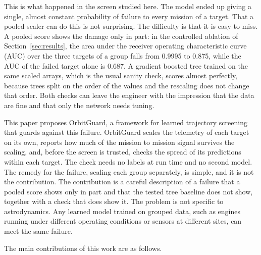This is what happened in the screen studied here. The model ended up giving a single, almost constant probability of failure to every mission of a target. That a pooled scaler can do this is not surprising. The difficulty is that it is easy to miss. A pooled score shows the damage only in part: in the controlled ablation of Section~\ref{sec:results}, the area under the receiver operating characteristic curve (AUC) over the three targets of a group falls from 0.9995 to 0.875, while the AUC of the failed target alone is 0.687. A gradient boosted tree trained on the same scaled arrays, which is the usual sanity check, scores almost perfectly, because trees split on the order of the values and the rescaling does not change that order. Both checks can leave the engineer with the impression that the data are fine and that only the network needs tuning.

This paper proposes OrbitGuard, a framework for learned trajectory screening that guards against this failure. OrbitGuard scales the telemetry of each target on its own, reports how much of the mission to mission signal survives the scaling, and, before the screen is trusted, checks the spread of its predictions within each target. The check needs no labels at run time and no second model. The remedy for the failure, scaling each group separately, is simple, and it is not the contribution. The contribution is a careful description of a failure that a pooled score shows only in part and that the tested tree baseline does not show, together with a check that does show it. The problem is not specific to astrodynamics. Any learned model trained on grouped data, such as engines running under different operating conditions or sensors at different sites, can meet the same failure.

The main contributions of this work are as follows.

